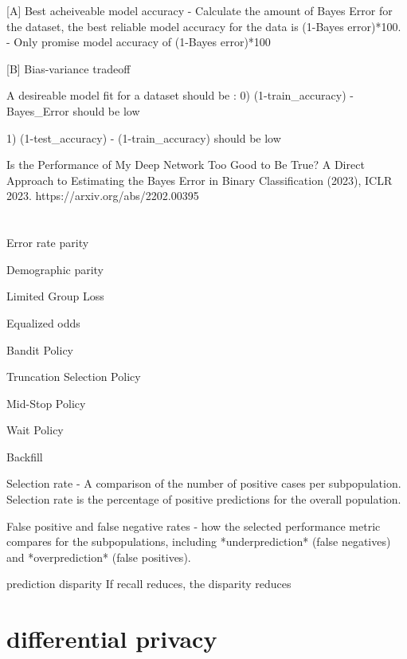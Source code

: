 \documentclass[11pt, onecolumn]{article}
\begin{document}
[A] Best acheiveable model accuracy
- Calculate the amount of Bayes Error for the dataset, the best reliable model accuracy for the data is (1-Bayes error)*100.
- Only promise model accuracy of (1-Bayes error)*100

[B] Bias-variance tradeoff 

A desireable model fit for a dataset should be :
0) (1-train_accuracy) - Bayes_Error should be low

1) (1-test_accuracy) - (1-train_accuracy) should be low 


Is the Performance of My Deep Network Too Good to Be True? A Direct Approach to Estimating the Bayes Error in Binary Classification (2023), ICLR 2023. https://arxiv.org/abs/2202.00395























\section{}

Error rate parity


Demographic parity


Limited Group Loss


Equalized odds


Bandit Policy


Truncation Selection Policy


Mid-Stop Policy


Wait Policy

Backfill


Selection rate - A comparison of the number of positive cases per subpopulation.
Selection rate is the percentage of positive predictions for the overall population.


False positive and false negative rates - how the selected performance metric compares for the subpopulations, including *underprediction* (false negatives) and *overprediction* (false positives).



prediction disparity
If recall reduces, the disparity reduces

\section{differential privacy}
\end{document}
